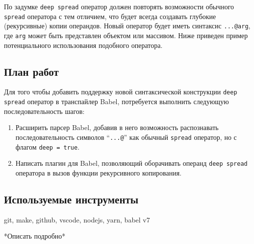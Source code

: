 \documentclass[14pt, a4paper]{article}
\def\code#1{\texttt{#1}} %
\begin{document}
По задумке \code{deep spread} оператор должен повторять возможности обычного \code{spread} оператора с тем отличием,
что будет всегда создавать глубокие (рекурсивные) копии операндов. Новый оператор будет иметь синтаксис \code{...@arg},
где \code{arg} может быть представлен объектом или массивом. Ниже приведен пример потенциального 
использования подобного оператора.


\subsection{План работ}
Для того чтобы добавить поддержку новой синтаксической конструкции \code{deep spread} оператор в 
транспайлер Babel, потребуется выполнить следующую последовательность шагов:
\begin{enumerate}
  \item Расширить парсер Babel, добавив в него возможность распознавать последовательность символов 
    ``\code{...@}'' как обычный \code{spread} оператор, но с флагом \code{deep = true}.  
  \item Написать плагин для Babel, позволяющий оборачивать операнд \code{deep spread} оператора в вызов функции рекурсивного копирования.
\end{enumerate}

\subsection{Используемые инструменты}
git, make, github, vscode, nodejs, yarn, babel v7

*Описать подробно*
\end{document}
